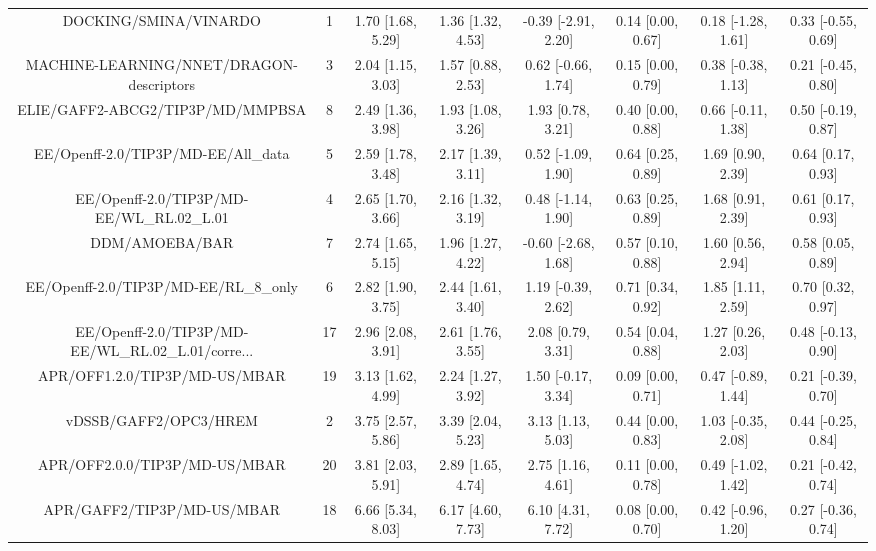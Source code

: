\documentclass[8pt]{article}
\begin{document}
\begin{center}
\begin{footnotesize}
\begin{longtable}{|cccccccc|}
\bottomrule
\endlastfoot
                             DOCKING/SMINA/VINARDO &   1 & 1.70 [1.68, 5.29] & 1.36 [1.32, 4.53] & -0.39 [-2.91, 2.20] & 0.14 [0.00, 0.67] & 0.18 [-1.28, 1.61] & 0.33 [-0.55, 0.69] \\
          MACHINE-LEARNING/NNET/DRAGON-descriptors &   3 & 2.04 [1.15, 3.03] & 1.57 [0.88, 2.53] &  0.62 [-0.66, 1.74] & 0.15 [0.00, 0.79] & 0.38 [-0.38, 1.13] & 0.21 [-0.45, 0.80] \\
                  ELIE/GAFF2-ABCG2/TIP3P/MD/MMPBSA &   8 & 2.49 [1.36, 3.98] & 1.93 [1.08, 3.26] &   1.93 [0.78, 3.21] & 0.40 [0.00, 0.88] & 0.66 [-0.11, 1.38] & 0.50 [-0.19, 0.87] \\
               EE/Openff-2.0/TIP3P/MD-EE/All\_data &   5 & 2.59 [1.78, 3.48] & 2.17 [1.39, 3.11] &  0.52 [-1.09, 1.90] & 0.64 [0.25, 0.89] &  1.69 [0.90, 2.39] &  0.64 [0.17, 0.93] \\
         EE/Openff-2.0/TIP3P/MD-EE/WL\_RL.02\_L.01 &   4 & 2.65 [1.70, 3.66] & 2.16 [1.32, 3.19] &  0.48 [-1.14, 1.90] & 0.63 [0.25, 0.89] &  1.68 [0.91, 2.39] &  0.61 [0.17, 0.93] \\
                                    DDM/AMOEBA/BAR &   7 & 2.74 [1.65, 5.15] & 1.96 [1.27, 4.22] & -0.60 [-2.68, 1.68] & 0.57 [0.10, 0.88] &  1.60 [0.56, 2.94] &  0.58 [0.05, 0.89] \\
             EE/Openff-2.0/TIP3P/MD-EE/RL\_8\_only &   6 & 2.82 [1.90, 3.75] & 2.44 [1.61, 3.40] &  1.19 [-0.39, 2.62] & 0.71 [0.34, 0.92] &  1.85 [1.11, 2.59] &  0.70 [0.32, 0.97] \\
EE/Openff-2.0/TIP3P/MD-EE/WL\_RL.02\_L.01/corre... &  17 & 2.96 [2.08, 3.91] & 2.61 [1.76, 3.55] &   2.08 [0.79, 3.31] & 0.54 [0.04, 0.88] &  1.27 [0.26, 2.03] & 0.48 [-0.13, 0.90] \\
                     APR/OFF1.2.0/TIP3P/MD-US/MBAR &  19 & 3.13 [1.62, 4.99] & 2.24 [1.27, 3.92] &  1.50 [-0.17, 3.34] & 0.09 [0.00, 0.71] & 0.47 [-0.89, 1.44] & 0.21 [-0.39, 0.70] \\
                             vDSSB/GAFF2/OPC3/HREM &   2 & 3.75 [2.57, 5.86] & 3.39 [2.04, 5.23] &   3.13 [1.13, 5.03] & 0.44 [0.00, 0.83] & 1.03 [-0.35, 2.08] & 0.44 [-0.25, 0.84] \\
                     APR/OFF2.0.0/TIP3P/MD-US/MBAR &  20 & 3.81 [2.03, 5.91] & 2.89 [1.65, 4.74] &   2.75 [1.16, 4.61] & 0.11 [0.00, 0.78] & 0.49 [-1.02, 1.42] & 0.21 [-0.42, 0.74] \\
                        APR/GAFF2/TIP3P/MD-US/MBAR &  18 & 6.66 [5.34, 8.03] & 6.17 [4.60, 7.73] &   6.10 [4.31, 7.72] & 0.08 [0.00, 0.70] & 0.42 [-0.96, 1.20] & 0.27 [-0.36, 0.74] \\
\end{longtable}
\end{footnotesize}
\end{center}
\end{document}
